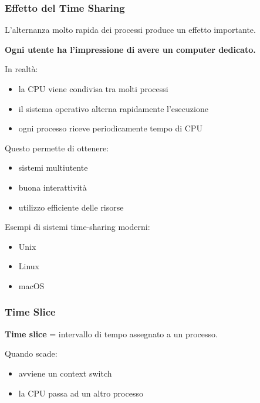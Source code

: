 \documentclass{beamer}
\begin{document}
\begin{frame}
	\frametitle{Effetto del Time Sharing}
	
	L'alternanza molto rapida dei processi produce
	un effetto importante.
	
	\textbf{Ogni utente ha l'impressione di avere un computer dedicato.}
	
	In realtà:
	
	\begin{itemize}
		\item la CPU viene condivisa tra molti processi
		\item il sistema operativo alterna rapidamente l'esecuzione
		\item ogni processo riceve periodicamente tempo di CPU
	\end{itemize}
	
	Questo permette di ottenere:
	
	\begin{itemize}
		\item sistemi multiutente
		\item buona interattività
		\item utilizzo efficiente delle risorse
	\end{itemize}
	
	Esempi di sistemi time-sharing moderni:
	
	\begin{itemize}
		\item Unix
		\item Linux
		\item macOS
	\end{itemize}
	
\end{frame}
	
	\begin{frame}
		\frametitle{Time Slice}
		
	\textbf{	Time slice }= intervallo di tempo assegnato a un processo.
		
		Quando scade:
		
		\begin{itemize}
			\item avviene un context switch
			\item la CPU passa ad un altro processo
		\end{itemize}
		
	\end{frame}
	
\end{document}
